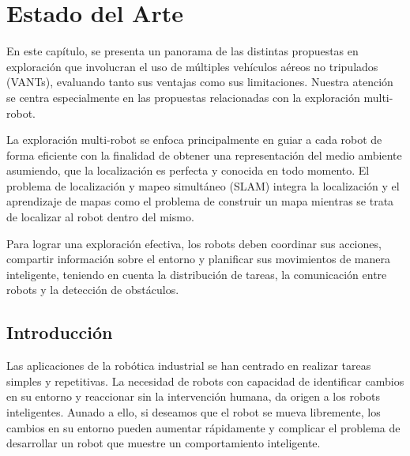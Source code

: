 \chapter{Estado del Arte}

En este capítulo, se presenta un panorama de las distintas propuestas en exploración que involucran el uso de múltiples vehículos aéreos no tripulados (VANTs), evaluando tanto sus ventajas como sus limitaciones. Nuestra atención se centra especialmente en las propuestas relacionadas con la exploración multi-robot. %


La exploración multi-robot se enfoca principalmente en guiar a cada robot de forma eficiente con la finalidad de obtener una representación del medio ambiente asumiendo, que la localización es perfecta y conocida en todo momento. El problema de localización y mapeo simultáneo (SLAM) integra la localización y el aprendizaje de mapas como el problema de construir un mapa mientras se trata de localizar al robot dentro del mismo.

Para lograr una exploración efectiva, los robots deben coordinar sus acciones, compartir información sobre el entorno y planificar sus movimientos de manera inteligente, teniendo en cuenta la distribución de tareas, la comunicación entre robots y la detección de obstáculos.%


\section{Introducción}

Las aplicaciones de la rob\'{o}tica industrial se han centrado en realizar tareas simples y repetitivas. La necesidad de robots con capacidad de identificar cambios en su entorno y reaccionar sin la intervenci\'{o}n humana, da origen a los robots inteligentes. Aunado a ello, si deseamos que el robot se mueva libremente, los cambios en su entorno pueden aumentar r\'{a}pidamente y complicar el problema de desarrollar un robot que muestre un comportamiento inteligente.

